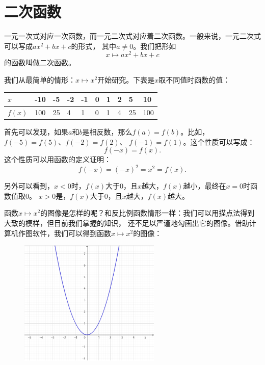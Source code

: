 \documentclass[12pt,UTF8]{ctexbook}
\begin{document}
\section{二次函数}
一元一次式对应一次函数，而一元二次式对应着二次函数。一般来说，一元二次式可以写成$ax^2 + bx + c$的形式，
其中$a \neq 0$。我们把形如
$$ x \mapsto ax^2 + bx + c$$
的函数叫做二次函数。

我们从最简单的情形：$x\mapsto x^2$开始研究。下表是$x$取不同值时函数的值：

\begin{center}
    \begin{tabular}{| p{2em}<{\centering} | p{1.8em}<{\centering} | p{1.8em}<{\centering} | p{1.8em}<{\centering} | p{1.8em}<{\centering} | p{1.8em}<{\centering} | p{1.8em}<{\centering} | p{1.8em}<{\centering} | p{1.8em}<{\centering} | p{1.8em}<{\centering} |}
        \hline
        $x$ & -10 & -5 & -2 & -1 & 0 & 1 & 2 & 5 & 10 \\ [0.5ex] 
        \hline
        $f(x)$ & 100 & 25 & 4 & 1 & 0 & 1 & 4 & 25 & 100 \\   
        \hline
    \end{tabular}
\end{center}

首先可以发现，如果$a$和$b$是相反数，那么$f(a) = f(b)$。比如，$f(-5) = f(5)$、$f(-2) = f(2)$、
$f(-1) = f(1)$。这个性质可以写成：
$$ f(-x) = f(x).$$
这个性质可以用函数的定义证明：
$$ f(-x) = (-x)^2 = x^2 = f(x).$$

另外可以看到，$x<0$时，$f(x)$大于$0$，且$x$越大，$f(x)$越小，最终在$x=0$时函数值取$0$。
$x > 0$是，$f(x)$大于$0$，且$x$越大，$f(x)$越大。

函数$x\mapsto x^2$的图像是怎样的呢？和反比例函数情形一样：我们可以用描点法得到大致的模样，但目前我们掌握的知识，
还不足以严谨地勾画出它的图像。借助计算机作图软件，我们可以得到函数$x\mapsto x^2$的图像：

\begin{figure}[h] %
    \vspace{8pt}
    \centering
    \includegraphics[width=0.6\textwidth]{二次函数1.png}
\end{figure}
\end{document}
